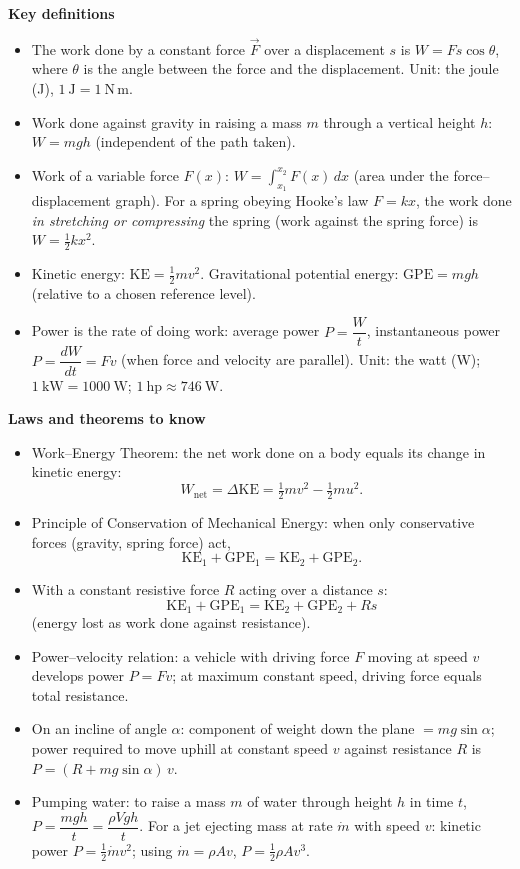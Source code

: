 \documentclass[11pt]{article}
\newcommand{\cle}[1]{{\popxbold\color{popdark}#1}}
\begin{document}
\begin{aretenir}
\textbf{Key definitions}
\begin{itemize}
\item The \cle{work} done by a constant force $\vec{F}$ over a displacement $s$ is $W = F s \cos\theta$, where $\theta$ is the angle between the force and the displacement. Unit: the \cle{joule} (J), $1\ \mathrm{J} = 1\ \mathrm{N\,m}$.
\item Work done \cle{against gravity} in raising a mass $m$ through a vertical height $h$: $W = mgh$ (independent of the path taken).
\item Work of a \cle{variable force} $F(x)$: $W = \displaystyle\int_{x_1}^{x_2} F(x)\,dx$ (area under the force--displacement graph). For a spring obeying Hooke's law $F = kx$, the work done \emph{in stretching or compressing} the spring (work against the spring force) is $W = \tfrac12 kx^2$.
\item \cle{Kinetic energy}: $\mathrm{KE} = \tfrac12 mv^2$. \cle{Gravitational potential energy}: $\mathrm{GPE} = mgh$ (relative to a chosen reference level).
\item \cle{Power} is the rate of doing work: average power $P = \dfrac{W}{t}$, instantaneous power $P = \dfrac{dW}{dt} = Fv$ (when force and velocity are parallel). Unit: the \cle{watt} (W); $1\ \mathrm{kW} = 1000\ \mathrm{W}$; $1\ \mathrm{hp} \approx 746\ \mathrm{W}$.
\end{itemize}

\textbf{Laws and theorems to know}
\begin{itemize}
\item \cle{Work--Energy Theorem}: the net work done on a body equals its change in kinetic energy:
\[ W_{\text{net}} = \Delta \mathrm{KE} = \tfrac12 mv^2 - \tfrac12 mu^2. \]
\item \cle{Principle of Conservation of Mechanical Energy}: when only conservative forces (gravity, spring force) act,
\[ \mathrm{KE}_1 + \mathrm{GPE}_1 = \mathrm{KE}_2 + \mathrm{GPE}_2. \]
\item With a constant resistive force $R$ acting over a distance $s$: 
\[ \mathrm{KE}_1 + \mathrm{GPE}_1 = \mathrm{KE}_2 + \mathrm{GPE}_2 + Rs \]
(energy lost as work done against resistance).
\item \cle{Power--velocity relation}: a vehicle with driving force $F$ moving at speed $v$ develops power $P = Fv$; at maximum constant speed, driving force equals total resistance.
\item On an incline of angle $\alpha$: component of weight down the plane $= mg\sin\alpha$; power required to move uphill at constant speed $v$ against resistance $R$ is $P = (R + mg\sin\alpha)\,v$.
\item \cle{Pumping water}: to raise a mass $m$ of water through height $h$ in time $t$, $P = \dfrac{mgh}{t} = \dfrac{\rho V g h}{t}$. For a jet ejecting mass at rate $\dot m$ with speed $v$: kinetic power $P = \tfrac12 \dot m v^2$; using $\dot m = \rho A v$, $P = \tfrac12 \rho A v^3$.
\end{itemize}


\end{aretenir}
\end{document}
